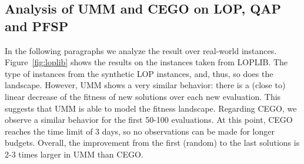 \documentclass[runningheads]{llncs}
\newcommand{\supplement}{\href{http://doi.org/10.5281/zenodo.4167148}{doi:10.5281/zenodo.4167148}}
\begin{document}

\subsection{Analysis of UMM and CEGO on LOP, QAP and PFSP}

In the following paragraphs we analyze the result over real-world instances. %
Figure~\ref{fig:loplib} shows the results on the instances taken from LOPLIB.
The type of instances from the synthetic LOP instances, and, thus, so does the
landscape. However, UMM shows a very similar behavior: there is a (close to)
linear decrease of the fitness of new solutions over each new evaluation. This
suggests that UMM is able to model the fitness landscape. Regarding CEGO, we
observe a similar behavior for the first 50-100 evaluations. At this point,
CEGO reaches the time limit of 3 days, so no observations can be made for
longer budgets.  Overall, the improvement from the first (random) to the last
solutions is 2-3 times larger in UMM than CEGO. %
\end{document}
